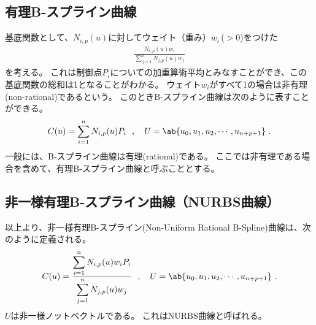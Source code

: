 \subsection{有理B-スプライン曲線}
基底関数として、$N_{i, p}(u)$に対してウェイト（重み）$w_i$\,($>0$)をつけた
\begin{align*}
  \frac{N_{i, p}(u)w_i}{\displaystyle\sum_{j=1}^nN_{j, p}(u)w_j}
\end{align*}
を考える。
これは制御点$P_i$についての加重算術平均とみなすことができ、この基底関数の総和は1となることがわかる。
ウェイト$w_i$がすべて1の場合は非有理(non-rational)であるという。
このときB-スプライン曲線は次のように表すことができる。
\begin{align*}
  C(u) = \sum_{i=1}^nN_{i, p}(u)P_i~~, \quad
  U = \ab\{u_0, u_1, u_2, \cdots, u_{n+p+1}\}\ .
\end{align*}
一般には、B-スプライン曲線は有理(rational)である。
ここでは非有理である場合を含めて、有理B-スプライン曲線と呼ぶこととする。


\subsection{非一様有理B-スプライン曲線（NURBS曲線）}
以上より、非一様有理B-スプライン(Non-Uniform Rational B-Spline)曲線は、次のように定義される。
\begin{align*}
  C(u) = \frac{\displaystyle\sum_{i=1}^nN_{i, p}(u)w_iP_i}{\displaystyle\sum_{j=1}^nN_{j, p}(u)w_j}~~,\quad
  U = \ab\{u_0, u_1, u_2, \cdots, u_{n+p+1}\}\ .
\end{align*}
$U$は非一様ノットベクトルである。
これはNURBS曲線と呼ばれる。

